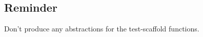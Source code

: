 \begin{itemize}
\end{itemize}

\subsection*{Reminder}

Don't produce any abstractions for the test-scaffold functions.
